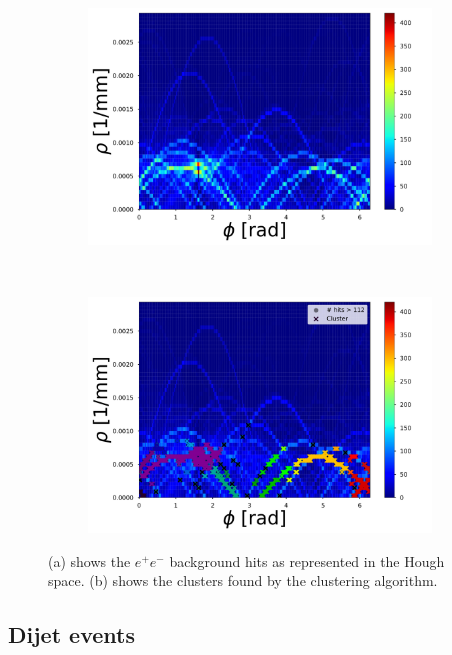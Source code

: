 \begin{figure}[ht]
	\centering
	\begin{subfigure}[b]{0.48\textwidth}
        \includegraphics[width=\textwidth]{figures/HT_background.pdf}
        \caption{}

    \end{subfigure}
		~ %
		\begin{subfigure}[b]{0.48\textwidth}
					\includegraphics[width=\textwidth]{figures/HT_background_maxima.pdf}
					\caption{}
			\end{subfigure}
	\caption{(a) shows the $e^+e^-$ background hits as represented in the Hough space. (b) shows the clusters found by the clustering algorithm.}
	\label{fig_bcg_HT}
\end{figure}


\subsection{Dijet events}

